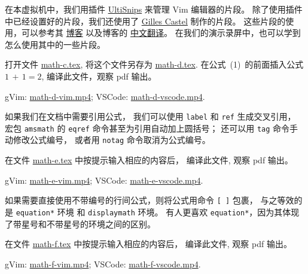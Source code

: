 \documentclass[
    11pt,
    base=hide,
    cite=authoryear,
    device=phone,
    lang=cn,
    mode=simple,
    result=answer,
    toc=onecol,
]{elegantbook_sierxue}
\begin{document}
在本虚拟机中，我们用插件
\href{https://github.com/SirVer/ultisnips}{UltiSnips}
来管理 Vim 编辑器的片段。
除了使用插件中已经设置好的片段，我们还使用了
\href{https://github.com/gillescastel/latex-snippets}{Gilles Castel}
制作的片段。
这些片段的使用，可以参考其
\href{https://castel.dev/post/lecture-notes-1/}{博客} 以及博客的
\href{https://bonxg.com/p/85.html}{中文翻译}。
在我们的演示录屏中，也可以学到怎么使用其中的一些片段。

\begin{exercise}\label{ex:math-d}
    打开文件
    \href{learn-latex/basic-02/math-c.tex}{math-c.tex},
    将这个文件另存为
    \href{learn-latex/basic-02/math-d.tex}{math-d.tex}.
    在公式~(1)~的前面插入公式 \(1\,+\,1 = 2\),
    编译此文件，观察 pdf 输出。
\end{exercise}
\begin{cast}\label{sol:math-d}
    gVim: \href{media/casts/math-d-vim.mp4}{math-d-vim.mp4};
    VSCode: \href{media/casts/math-d-vscode.mp4}{math-d-vscode.mp4}.
\end{cast}

如果我们在文档中需要引用公式，
我们可以使用 \texttt{label} 和 \texttt{ref} 生成交叉引用，
宏包 \texttt{amsmath} 的 \texttt{eqref} 命令甚至为引用自动加上圆括号；
还可以用 \texttt{tag} 命令手动修改公式编号，
或者用 \texttt{notag} 命令取消为公式编号。

\begin{exercise}\label{ex:math-e}
    在文件 \href{learn-latex/basic-02/math-e.tex}{math-e.tex}
    中按提示输入相应的内容后，
    编译此文件, 观察 pdf 输出。
\end{exercise}
\begin{cast}\label{cast:math-e}
    gVim: \href{media/casts/math-e-vim.mp4}{math-e-vim.mp4};
    VSCode: \href{media/casts/math-e-vscode.mp4}{math-e-vscode.mp4}.
\end{cast}

如果需要直接使用不带编号的行间公式，则将公式用命令 \texttt{[~]} 包裹，
与之等效的是 \texttt{equation*} 环境 和 \texttt{displaymath} 环境。
有人更喜欢 \texttt{equation*}，因为其体现了带星号和不带星号的环境之间的区别。

\begin{exercise}\label{ex:math-f}
    在文件 \href{learn-latex/basic-02/math-f.tex}{math-f.tex}
    中按提示输入相应的内容后，
    编译此文件, 观察 pdf 输出。
\end{exercise}
\begin{cast}\label{cast:math-f}
    gVim: \href{media/casts/math-f-vim.mp4}{math-f-vim.mp4};
    VSCode: \href{media/casts/math-f-vscode.mp4}{math-f-vscode.mp4}.
\end{cast}
\end{document}

